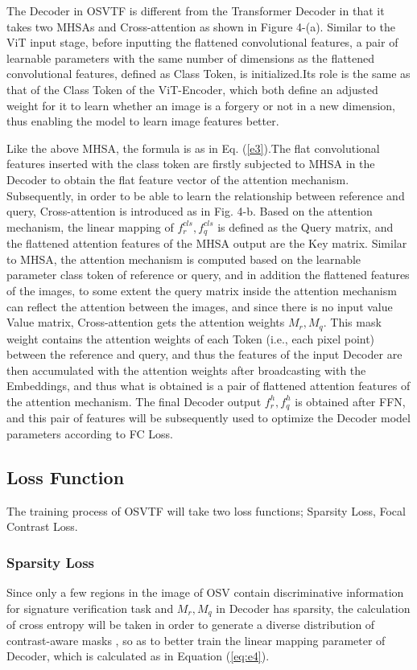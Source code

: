 \documentclass{article}
\begin{document}
The Decoder in OSVTF is different from the Transformer Decoder in that it takes two MHSAs and Cross-attention as shown in Figure 4-(a). Similar to the ViT input stage, before inputting the flattened convolutional features, a pair of learnable parameters with the same number of dimensions as the flattened convolutional features, defined as Class Token, is initialized.Its role is the same as that of the Class Token of the ViT-Encoder, which both define an adjusted weight for it to learn whether an image is a forgery or not in a new dimension, thus enabling the model to learn image features better.

Like the above MHSA, the formula is as in Eq. (\ref{e3}).The flat convolutional features inserted with the class token are firstly subjected to MHSA in the Decoder to obtain the flat feature vector of the attention mechanism. Subsequently, in order to be able to learn the relationship between reference and query, Cross-attention is introduced as in Fig. 4-b. Based on the attention mechanism, the linear mapping of $f_r^{cls},f_q^{cls}$ is defined as the Query matrix, and the flattened attention features of the MHSA output are the Key matrix. Similar to MHSA, the attention mechanism is computed based on the learnable parameter class token of reference or query, and in addition the flattened features of the images, to some extent the query matrix inside the attention mechanism can reflect the attention between the images, and since there is no input value Value matrix, Cross-attention gets the attention weights $M_r ,M_q$. This mask weight contains the attention weights of each Token (i.e., each pixel point) between the reference and query, and thus the features of the input Decoder are then accumulated with the attention weights after broadcasting with the Embeddings, and thus what is obtained is a pair of flattened attention features of the attention mechanism. The final Decoder output $f_r^h,f_q^h$ is obtained after FFN, and this pair of features will be subsequently used to optimize the Decoder model parameters according to FC Loss.

\subsection{Loss Function}

The training process of OSVTF will take two loss functions; Sparsity Loss, Focal Contrast Loss.

\subsubsection*{Sparsity Loss}
Since only a few regions in the image of OSV contain discriminative information for signature verification task and $M_r,M_q$ in Decoder has sparsity, the calculation of cross entropy will be taken in order to generate a diverse distribution of contrast-aware masks \cite{16}, so as to better train the linear mapping parameter of Decoder, which is calculated as in Equation (\ref{eq:e4}).
\end{document}
